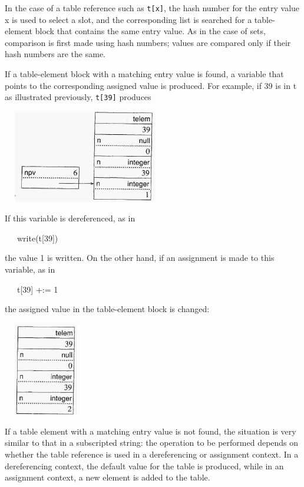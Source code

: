 In the case of a table reference such as \texttt{t[x]}, the hash
number for the entry value x is used to select a slot, and the
corresponding list is searched for a table-element block that contains
the same entry value. As in the case of sets, comparison is first made
using hash numbers; values are compared only if their hash numbers are
the same.

If a table-element block with a matching entry value is found, a
variable that points to the corresponding assigned value is
produced. For example, if 39 is in t as illustrated previously,
\texttt{t[39]} produces

\ \  \includegraphics[width=2.5654in,height=1.602in]{ib-img/ib-img039.jpg} 

If this variable is dereferenced, as in

{\ttfamily\mdseries
\ \ \ write(t[39])}

\noindent the value 1 is written. On the other hand, if an assignment
is made to this variable, as in

{\ttfamily\mdseries
\ \ \ t[39] +:= 1}

\noindent the assigned value in the table-element block is changed:

\ \  \includegraphics[width=1.1752in,height=1.6189in]{ib-img/ib-img040.jpg} 

If a table element with a matching entry value is not found, the
situation is very similar to that in a subscripted string: the
operation to be performed depends on whether the table reference is
used in a dereferencing or assignment context. In a dereferencing
context, the default value for the table is produced, while in an
assignment context, a new element is added to the table.

